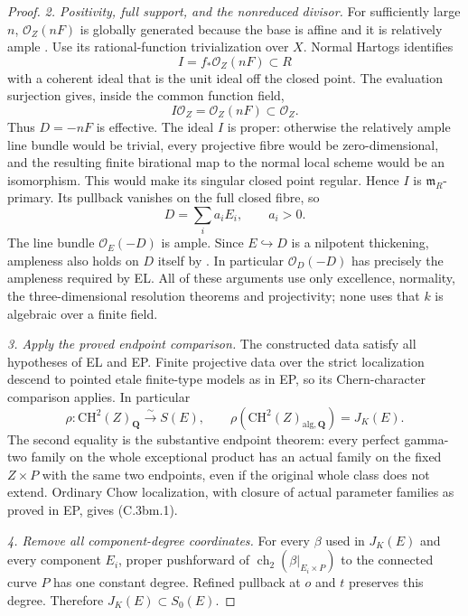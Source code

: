 \begin{proof}
\emph{2. Positivity, full support, and the nonreduced divisor.}
For sufficiently large $n$, $\mathcal O_Z(nF)$ is globally generated
because the base is affine and it is relatively ample
\citep[Proposition 28.27.13(7)]{frC3bdStacksGeneration}.
Use its rational-function trivialization over $X$. Normal Hartogs
\citep[Remark 31.17.2]{frC3bdStacksHartogs} identifies
\[
                 I=f_*\mathcal O_Z(nF)\subset R
\]
with a coherent ideal that is the unit ideal off the closed point.
The evaluation surjection gives, inside the common function field,
\[
                 I\mathcal O_Z=\mathcal O_Z(nF)\subset\mathcal O_Z.
\]
Thus $D=-nF$ is effective. The ideal $I$ is proper: otherwise the
relatively ample line bundle would be trivial, every projective
fibre would be zero-dimensional, and the resulting finite birational
map to the normal local scheme would be an isomorphism. This would
make its singular closed point regular. Hence $I$ is
$\mathfrak m_R$-primary. Its pullback vanishes on the full closed
fibre, so
\[
                           D=\sum_i a_iE_i,\qquad a_i>0.
\]
The line bundle $\mathcal O_E(-D)$ is ample. Since $E\hookrightarrow D$
is a nilpotent thickening, ampleness also holds on $D$ itself by
\citet[Lemma 30.17.5, Tag 09MS]{rootStacks2026NilpotentAmple}. In particular
$\mathcal O_D(-D)$ has precisely the ampleness required by EL.
All of these arguments use only excellence, normality, the
three-dimensional resolution theorems and projectivity; none uses
that $k$ is algebraic over a finite field.

\emph{3. Apply the proved endpoint comparison.}
The constructed data satisfy all hypotheses of EL and EP.
Finite projective data over the strict localization descend to
pointed etale finite-type models as in EP, so its Chern-character
comparison applies. In particular
\[
 \rho:\mathrm{CH}^2(Z)_{\mathbf Q}\xrightarrow{\sim}S(E),
 \qquad
 \rho(\mathrm{CH}^2(Z)_{\mathrm{alg},\mathbf Q})=J_K(E).
\]
The second equality is the substantive endpoint theorem: every
perfect gamma-two family on the whole exceptional product has
an actual family on the fixed $Z\times P$ with the same two
endpoints, even if the original whole class does not extend.
Ordinary Chow localization, with closure of actual parameter
families as proved in EP, gives (C.3bm.1).

\emph{4. Remove all component-degree coordinates.}
For every $\beta$ used in $J_K(E)$ and every component $E_i$,
proper pushforward of $\operatorname{ch}_2(\beta|_{E_i\times P})$
to the connected curve $P$ has one constant degree. Refined
pullback at $o$ and $t$ preserves this degree. Therefore
$J_K(E)\subset S_0(E)$.


\end{proof}
